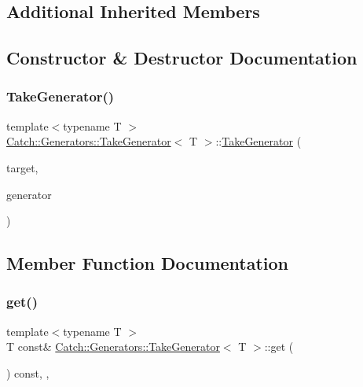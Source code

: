 \subsection*{Additional Inherited Members}


\subsection{Constructor \& Destructor Documentation}
\mbox{\label{class_catch_1_1_generators_1_1_take_generator_aacef789c01a86246249c88a184268c65}} 
\subsubsection{\texorpdfstring{TakeGenerator()}{TakeGenerator()}}
{\footnotesize\ttfamily template$<$typename T $>$ \\
\mbox{\hyperlink{class_catch_1_1_generators_1_1_take_generator}{Catch\+::\+Generators\+::\+Take\+Generator}}$<$ T $>$\+::\mbox{\hyperlink{class_catch_1_1_generators_1_1_take_generator}{Take\+Generator}} (\begin{DoxyParamCaption}\item[{size\+\_\+t}]{target,  }\item[{\mbox{\hyperlink{class_catch_1_1_generators_1_1_generator_wrapper}{Generator\+Wrapper}}$<$ T $>$ \&\&}]{generator }\end{DoxyParamCaption})\hspace{0.3cm}{\ttfamily [inline]}}



\subsection{Member Function Documentation}
\mbox{\label{class_catch_1_1_generators_1_1_take_generator_aa4d2560f2066ec2eb4a351d62c107c78}} 
\subsubsection{\texorpdfstring{get()}{get()}}
{\footnotesize\ttfamily template$<$typename T $>$ \\
T const\& \mbox{\hyperlink{class_catch_1_1_generators_1_1_take_generator}{Catch\+::\+Generators\+::\+Take\+Generator}}$<$ T $>$\+::get (\begin{DoxyParamCaption}{ }\end{DoxyParamCaption}) const\hspace{0.3cm}{\ttfamily [inline]}, {\ttfamily [override]}, {\ttfamily [virtual]}}



